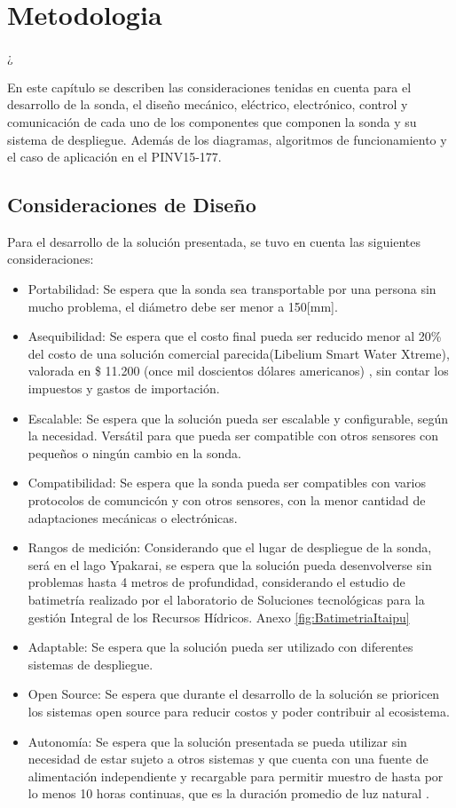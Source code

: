 \chapter[Metodolog\'ia.]{Metodologia}¿
\pagestyle{fancy}

En este cap\'itulo se describen las consideraciones tenidas en cuenta para el desarrollo de la sonda, el diseño mec\'anico, el\'ectrico, electr\'onico, control y comunicaci\'on de cada uno de los componentes que componen la sonda y su sistema de despliegue. Adem\'as de los diagramas, algoritmos de funcionamiento y el caso de aplicaci\'on en el PINV15-177.

\section[Consideraciones del sistema]{Consideraciones de Dise\~no}
Para el desarrollo de la soluci\'on presentada, se tuvo en cuenta las siguientes consideraciones:
\begin{itemize}
    \item Portabilidad: Se espera que la sonda sea transportable por una persona sin mucho problema, el di\'ametro debe ser menor a 150[mm].
    \item Asequibilidad: Se espera que el costo final pueda ser reducido menor al 20\% del costo de una soluci\'on comercial parecida(Libelium Smart Water Xtreme), valorada en \$ 11.200 (once mil doscientos d\'olares americanos) \cite{storeLibelium}, sin contar los impuestos y gastos de importaci\'on.  
    \item Escalable: Se espera que la soluci\'on pueda ser escalable y configurable, seg\'un la necesidad. Vers\'atil para que pueda ser compatible con otros sensores con peque\~nos o ningún cambio en la sonda.
    \item Compatibilidad: Se espera que la sonda pueda ser compatibles con varios protocolos de comuncic\'on y con otros sensores, con la menor cantidad de adaptaciones mec\'anicas o electr\'onicas. 
    \item Rangos de medici\'on: Considerando que el lugar de despliegue de la sonda, ser\'a en el lago Ypakarai, se espera que la soluci\'on pueda desenvolverse sin problemas hasta 4 metros de profundidad, considerando el estudio de batimetr\'ia realizado por el laboratorio de Soluciones tecnol\'ogicas para la gesti\'on Integral de los Recursos H\'idricos. Anexo \ref{fig:BatimetriaItaipu}
    \item Adaptable: Se espera que la soluci\'on pueda ser utilizado con diferentes sistemas de despliegue.
    \item Open Source: Se espera que durante el desarrollo de la soluci\'on se prioricen los sistemas open source para reducir costos y poder contribuir al ecosistema. 
    \item Autonom\'ia: Se espera que la soluci\'on presentada se pueda utilizar sin necesidad de estar sujeto a otros sistemas y que cuenta con una fuente de alimentaci\'on independiente y recargable para permitir muestro de hasta por lo menos 10 horas continuas, que es la duraci\'on promedio de luz natural \cite{ClimaSol}. 
    
\end{itemize}

